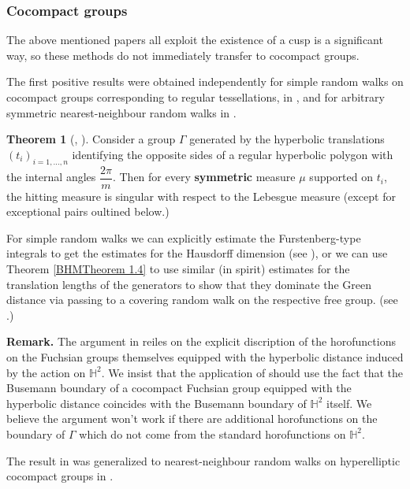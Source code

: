 \documentclass[11pt]{amsart}
\theoremstyle{definition}
\newtheorem{theorem}{Theorem}[section]
\begin{document}
	\subsubsection{Cocompact groups} 
	
	The above mentioned papers all exploit the existence of a cusp is a significant way, so these methods do not immediately transfer to cocompact groups. 
	
	The first positive results were obtained independently for simple random walks on cocompact groups corresponding to regular tessellations, in \cite{Carrasco2019OnTS}, and for arbitrary symmetric nearest-neighbour random walks in \cite{10.1093/imrn/rnaa213}.
	
	\begin{theorem}[\cite{Carrasco2019OnTS}, \cite{10.1093/imrn/rnaa213}]
		Consider a group $\Gamma$ generated by the hyperbolic translations $(t_i)_{i = 1, \dots, n}$ identifying the opposite sides of a regular hyperbolic polygon with the internal angles $\dfrac{2\pi}{m}$. Then for every \textbf{symmetric} measure $\mu$ supported on $t_i$, the hitting measure is singular with respect to the Lebesgue measure (except for exceptional pairs oultined below.)  
	\end{theorem}
	
	For simple random walks we can explicitly estimate the Furstenberg-type integrals to get the estimates for the Hausdorff dimension (see \cite{Carrasco2019OnTS}), or we can use Theorem \ref{BHMTheorem 1.4} to use similar (in spirit) estimates for the translation lengths of the generators to show that they dominate the Green distance via passing to a covering random walk on the respective free group. (see \cite{10.1093/imrn/rnaa213}.)
	
	\textbf{Remark.} The argument in \cite{Carrasco2019OnTS} reiles on the explicit discription of the horofunctions on the Fuchsian groups themselves equipped with the hyperbolic distance induced by the action on $\mathbb{H}^2$. We insist that the application of \cite[Theorem 3.1]{Carrasco2019OnTS} should use the fact that the Busemann boundary of a cocompact Fuchsian group equipped with the hyperbolic distance coincides with the Busemann boundary of $\mathbb{H}^2$ itself. We believe the argument won't work if there are additional horofunctions on the boundary of $\Gamma$ which do not come from the standard horofunctions on $\mathbb{H}^2$. 
	
	The result in \cite{10.1093/imrn/rnaa213} was generalized to nearest-neighbour random walks on hyperelliptic cocompact groups in \cite{kosenko_tiozzo_2022}.
	
\end{document}
